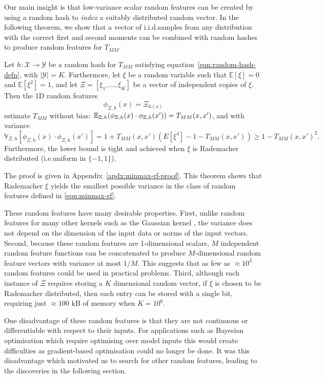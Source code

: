 Our main insight is that low-variance scalar random features can be created
by using a random hash to \emph{index} a suitably distributed random vector.
In the following theorem, we show that a vector of i.i.d.\@ samples
from any distribution with the correct first and second moments
can be combined with random hashes to produce random features for $T_{MM}$.
\begin{theorem}\label{thm:general-minmax-rf}
    Let $h:\mathcal X \to \mathcal Y$ be a random hash for $T_{MM}$ satisfying equation~\ref{eqn:random-hash-defn}, with $|\mathcal Y|=K$. Furthermore, let $\xi$ be a random variable such that $\mathbb{E}[\xi]=0$ and $\mathbb{E}[\xi^2]=1$,
    and let $\Xi=[\xi_1,\ldots,\xi_K]$ be a vector of independent copies of $\xi$.
    Then the 1D random features 
    \begin{equation}\label{eqn:minmax-rf}
        \phi_{\Xi,h}(x)=\Xi_{h(x)}  
    \end{equation}
    estimate $T_{MM}$ without bias: 
    $\mathbb{E}_{\Xi,h}(\phi_{\Xi,h}(x)\cdot\phi_{\Xi,h}(x')) = T_{MM}(x,x')$,
    and with variance
    \begin{equation}\label{eqn:general-minmax-rf-variance}
    \mathbb{V}_{\Xi,h}\left[\phi_{\Xi,h}(x)\cdot \phi_{\Xi,h}(x')\right] = 1+T_{MM}(x,x')\left(E[\xi^4]-1-T_{MM}(x,x')\right) \ge 1-T_{MM}(x,x')^2.
    \end{equation}
    Furthermore, the lower bound is tight and achieved when $\xi$ is Rademacher distributed (i.e.\@ uniform in $\{-1,1\}$).
\end{theorem}

The proof is given in Appendix~\ref{apdx:minmax-rf-proof}. This theorem shows that Rademacher $\xi$ yields the smallest possible variance in the class of random features defined in \cref{eqn:minmax-rf}.

These random features have many desirable properties. First, unlike random features for many other kernels such as the Gaussian kernel \citep{liu2021random},
the variance does not depend on the dimension of the input data or norms of the input vectors.
Second, because these random features are 1-dimensional scalars,
$M$ independent random feature functions can be concatenated to produce $M$-dimensional random feature
vectors with variance at most $1/M$.
This suggests that as few as $\approx10^3$ random features could be used in practical problems.
Third, although each instance of $\Xi$ requires storing a $K$ dimensional random vector,
if $\xi$ is chosen to be Rademacher distributed, then each entry can be stored with a single bit,
requiring just $\approx 100$ kB of memory when $K=10^6$.

One disadvantage of these random features
is that they are not continuous or differentiable with respect to their inputs.
For applications such as Bayesian optimisation which require optimising over model inputs
this would create difficulties as gradient-based optimisation could no longer be done.
It was this disadvantage which motivated us to search for other random features,
leading to the discoveries in the following section.
